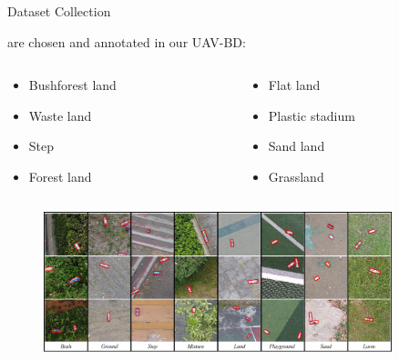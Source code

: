 \documentclass[newPxFont, fullfooter, sectionpages, progressbar, displaynote]{beamer}
\begin{document}

\begin{frame}{Dataset Collection}

	 are chosen and annotated in our UAV-BD:

	\begin{columns}[c]
		\begin{column}{0.3\textwidth}
			\begin{itemize}
			\item \small{Bushforest land}
			\item \small{Waste land}
			\item \small{Step}
			\item \small{Forest land}
			\end{itemize}
		\end{column}

		\begin{column}{0.3\textwidth}
			\begin{itemize}
			\item \small{Flat land}
			\item \small{Plastic stadium}
			\item \small{Sand land}
			\item \small{Grassland}
			\end{itemize}
		\end{column}
	\end{columns}
	\begin{figure}
		\centering
		\includegraphics[width=0.9\textwidth]{images/dataset1.jpg}
	\end{figure}
\end{frame}

\end{document}

